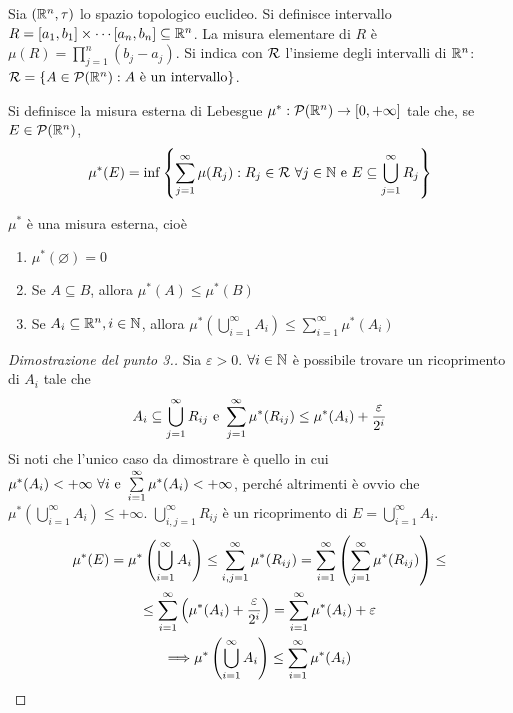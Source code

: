 \begin{definition}
	[Intervallo]
	Sia $(\mathbb{R}^n,\tau)$ lo spazio topologico euclideo. Si definisce intervallo $R=[a_1,b_1]\times\cdots[a_n,b_n] \subseteq \mathbb{R}^n$. La misura elementare di $R$ è $\mu(R)=\prod\limits_{j=1}^n(b_j-a_j)$. Si indica con $\mathcal{R}$ l'insieme degli intervalli di $\mathbb{R}^n$: $\mathcal{R}=\{A \in \mathcal{P}(\mathbb{R}^n):A \text{ è un intervallo}\}$.
\end{definition}

\begin{definition}
	Si definisce la misura esterna di Lebesgue $\mu^*:\mathcal{P}(\mathbb{R}^n)\to [0,+\infty]$ tale che, se $E \in \mathcal{P}(\mathbb{R}^n)$,
	$$
		\mu^*(E)=\inf \left\{\sum\limits_{j=1}^\infty \mu(R_j):R_j \in \mathcal{R} \ \forall j \in \mathbb{N} \text{ e } E \subseteq \bigcup\limits_{j=1}^\infty R_j\right\}
	$$
\end{definition}

\begin{theorem}
	$\mu^*$ è una misura esterna, cioè
	\begin{enumerate}
		\item $\mu^*(\varnothing)=0$
		\item Se $A \subseteq B$, allora $\mu^*(A)\leq \mu^*(B)$
		\item Se $A_i \subseteq \mathbb{R}^n, i \in \mathbb{N}$, allora $\mu^*\left(\bigcup\limits_{i=1}^\infty A_i\right)\leq \sum\limits_{i=1}^\infty \mu^*(A_i)$
	\end{enumerate}
\end{theorem}

\begin{proof}
	[Dimostrazione del punto 3.]
	Sia $\varepsilon>0$. $\forall i \in \mathbb{N}$ è possibile trovare un ricoprimento di $A_i$ tale che
	$$A_i\subseteq \bigcup\limits_{j=1}^\infty R_{ij} \text{ e } \sum\limits_{j=1}^\infty \mu^*(R_{ij})\leq \mu^*(A_i)+\frac{\varepsilon}{2^i}$$
	Si noti che l'unico caso da dimostrare è quello in cui $\mu^*(A_i)<+\infty \ \forall i \text{ e } \sum\limits_{i=1}^\infty \mu^*(A_i)<+\infty$, perché altrimenti è ovvio che $\mu^*\left(\bigcup\limits_{i=1}^\infty A_i\right)\leq +\infty$. $\bigcup\limits_{i,j=1}^\infty R_{ij}$ è un ricoprimento di $E=\bigcup\limits_{i=1}^\infty A_i$.
	\begin{gather*}
		\mu^*(E)=\mu^*\left(\bigcup_{i=1}^\infty A_i\right)\leq \sum_{i,j=1}^{\infty}\mu^*(R_{ij})=\sum_{i=1}^\infty\left(\sum_{j=1}^{\infty}\mu^*(R_{ij})\right)\leq\\
		\leq\sum_{i=1}^{\infty}\left(\mu^*(A_i)+\frac{\varepsilon}{2^i}\right)=\sum_{i=1}^\infty \mu^*(A_i)+\varepsilon\\
		\Longrightarrow \mu^*\left(\bigcup_{i=1}^\infty A_i\right)\leq \sum_{i=1}^\infty \mu^*(A_i)
	\end{gather*}
\end{proof}

